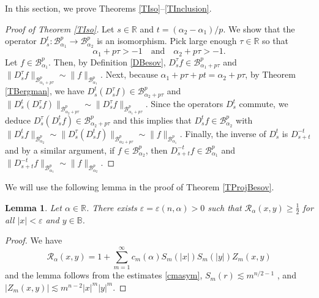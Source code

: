 \documentclass{amsart}
\newtheorem{lemma}[theorem]{Lemma}
\theoremstyle{definition}
\theoremstyle{remark}
\begin{document}
In this section, we prove Theorems \ref{TIso}--\ref{TInclusion}.

\begin{proof}[Proof of Theorem \ref{TIso}]
Let $s\in\mathbb R$ and $t=(\alpha_2-\alpha_1)/p$.
We show that the operator
$D^t_s\colon\mathcal B^p_{\alpha_1}\to\mathcal B^p_{\alpha_2}$
is an isomorphism.
Pick large enough $\tau\in\mathbb R$ so that
\begin{equation*}
\alpha_1+p\tau>-1
\quad\text{and}\quad
\alpha_2+p\tau>-1.
\end{equation*}
Let $f\in\mathcal B^p_{\alpha_1}$.
Then, by Definition \ref{DBesov}, $D^\tau_s f\in\mathcal B^p_{\alpha_1+p\tau}$
and $\|D^\tau_s f\|_{\mathcal B^p_{\alpha_1+p\tau}}\sim\|f\|_{\mathcal B^p_{\alpha_1}}$.
Next, because $\alpha_1+p\tau+pt=\alpha_2+p\tau$,
by Theorem \ref{TBergman}, we have $D^t_s(D^\tau_s f)\in\mathcal B^p_{\alpha_2+p\tau}$
and $\|D^t_s(D^\tau_s f)\|_{\mathcal B^p_{\alpha_2+p\tau}}
\sim \|D^\tau_s f\|_{\mathcal B^p_{\alpha_1+p\tau}}$.
Since the operators $D^t_s$ commute, we deduce
$D^\tau_s(D^t_s f)\in\mathcal B^p_{\alpha_2+p\tau}$
and this implies that $D^t_s f\in\mathcal B^p_{\alpha_2}$ with
$\|D^t_s f\|_{\mathcal B^p_{\alpha_2}}
\sim \|D^\tau_s(D^t_s f)\|_{\mathcal B^p_{\alpha_2+p\tau}}
\sim \|f\|_{\mathcal B^p_{\alpha_1}}$.
Finally, the inverse of $D^t_s$ is $D^{-t}_{s+t}$ and by a similar argument,
if $f\in\mathcal B^p_{\alpha_2}$, then $D^{-t}_{s+t}f\in\mathcal B^p_{\alpha_1}$
and $\|D^{-t}_{s+t}f\|_{\mathcal B^p_{\alpha_1}}
\sim \|f\|_{\mathcal B^p_{\alpha_2}}$.
\end{proof}

We will use the following lemma in the proof of Theorem \ref{TProjBesov}.

\begin{lemma}\label{LRbig}
Let $\alpha\in\mathbb R$.
There exists $\varepsilon=\varepsilon(n,\alpha)>0$ such that
$\mathcal R_\alpha(x,y)\ge \frac{1}{2}$ for all
$\vert x\vert<\varepsilon$ and $y\in\mathbb B$.
\end{lemma}

\begin{proof}
We have
\begin{equation*}
\mathcal R_\alpha(x,y)=1+\sum_{m=1}^\infty
c_m(\alpha)S_m(\vert x\vert)S_m(\vert y\vert)Z_m(x,y)
\end{equation*}
and the lemma follows from the estimates \eqref{cmasym},
$S_m(r)\lesssim m^{n/2-1}$ \cite[Lemma 2.13]{U}, and
$\vert Z_m(x,y)\vert\lesssim m^{n-2}\vert x\vert^m\vert y\vert^m$.
\end{proof}
\end{document}
